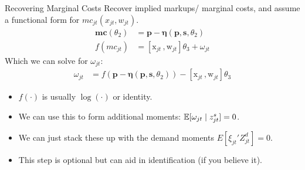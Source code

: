 \begin{frame}{Recovering Marginal Costs }
Recover implied markups/ marginal costs, and assume a functional form for $mc_{jt}(x_{jt},w_{jt})$.
\begin{align*}
\symbf{mc}(\theta_2)&= \symbf{p}- \symbf{\eta}(\symbf{p},\symbf{s},\theta_2)\\
f(mc_{jt}) &= [\textrm{x}_{jt} \,, \textrm{w}_{jt}] \theta_3 + \omega_{jt}
\end{align*}
Which we can solve for $\omega_{jt}$:
\begin{align*}
\omega_{jt} &=  f(\symbf{p}- \symbf{\eta}(\symbf{p},\symbf{s},\theta_2) ) -[\textrm{x}_{jt} \,, \textrm{w}_{jt}] \theta_3 
\end{align*}
\begin{itemize}
\item $f(\cdot)$ is usually $\log(\cdot)$ or identity.
\item We can use this to form additional moments: $\mathbb{E}[\omega_{jt} \mid  z_{jt}^{s}]=0$.
\item We can just stack these up with the demand moments $E[\xi_{jt}' Z_{jt}^d]=0$.
\item This step is optional but can aid in identification (if you believe it).
\end{itemize}
\end{frame}





